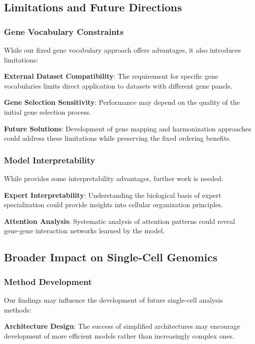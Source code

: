 \subsection{Limitations and Future Directions}

\subsubsection{Gene Vocabulary Constraints}

While our fixed gene vocabulary approach offers advantages, it also introduces limitations:

\textbf{External Dataset Compatibility}: The requirement for specific gene vocabularies limits direct application to datasets with different gene panels.

\textbf{Gene Selection Sensitivity}: Performance may depend on the quality of the initial gene selection process.

\textbf{Future Solutions}: Development of gene mapping and harmonization approaches could address these limitations while preserving the fixed ordering benefits.

\subsubsection{Model Interpretability}

While \bioformer{} provides some interpretability advantages, further work is needed:

\textbf{Expert Interpretability}: Understanding the biological basis of expert specialization could provide insights into cellular organization principles.

\textbf{Attention Analysis}: Systematic analysis of attention patterns could reveal gene-gene interaction networks learned by the model.

\subsection{Broader Impact on Single-Cell Genomics}

\subsubsection{Method Development}

Our findings may influence the development of future single-cell analysis methods:

\textbf{Architecture Design}: The success of simplified architectures may encourage development of more efficient models rather than increasingly complex ones.

